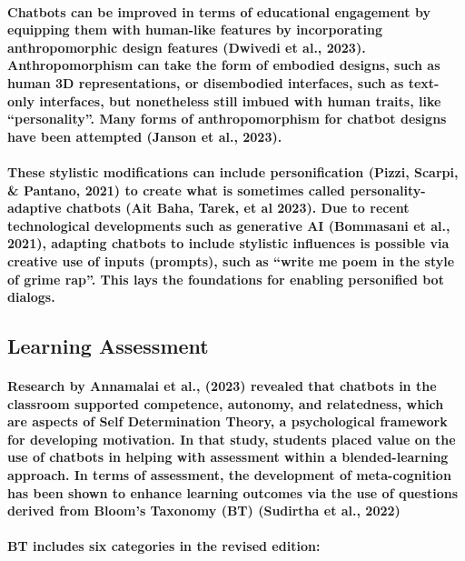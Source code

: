 \documentclass{article}
\begin{document}
\paragraph{Chatbots can be improved in terms of educational engagement by equipping them with human-like features by incorporating anthropomorphic design features (Dwivedi et al., 2023). Anthropomorphism can take the form of embodied designs, such as human 3D representations, or disembodied interfaces, such as text-only interfaces, but nonetheless still imbued with human traits, like “personality”. Many forms of anthropomorphism for chatbot designs have been attempted (Janson et al., 2023).}

\paragraph{These stylistic modifications can include personification (Pizzi, Scarpi, \& Pantano, 2021) to create what is sometimes called personality-adaptive chatbots (Ait Baha, Tarek, et al 2023). Due to recent technological developments such as generative AI (Bommasani et al., 2021), adapting chatbots to include stylistic influences is possible via creative use of inputs (prompts), such as “write me poem in the style of grime rap”. This lays the foundations for enabling personified bot dialogs.}

\subsection*{Learning Assessment}

\paragraph{Research by Annamalai et al., (2023) revealed that chatbots in the classroom supported competence, autonomy, and relatedness, which are aspects of Self Determination Theory, a psychological framework for developing motivation. In that study, students placed value on the use of chatbots in helping with assessment within a blended-learning approach. In terms of assessment, the development of meta-cognition has been shown to enhance learning outcomes via the use of questions derived from Bloom’s Taxonomy (BT) (Sudirtha et al., 2022)}

\paragraph{BT includes six categories in the revised edition:}
\end{document}
